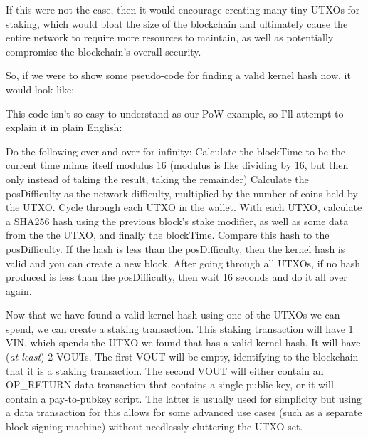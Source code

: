 If this were not the case, then it would encourage creating many tiny UTXOs 
for staking, which would bloat the size of the blockchain and ultimately 
cause the entire network to require more resources to maintain, as well as 
potentially compromise the blockchain's overall security.



So, if we were to show some pseudo-code for finding a valid kernel hash now, 
it would look like:



\vspace{5mm} %



\vspace{5mm} %



This code isn't so easy to understand as our PoW example, so I'll attempt to 
explain it in plain English:



Do the following over and over for infinity:
Calculate the blockTime to be the current time minus itself modulus 16
(modulus is like dividing by 16, but then only instead of taking the
result, taking the remainder)
Calculate the posDifficulty as the network difficulty, multiplied by the
number of coins held by the UTXO.
Cycle through each UTXO in the wallet. With each UTXO, calculate a SHA256
hash using the previous block's stake modifier, as well as some data from
the the UTXO, and finally the blockTime. Compare this hash to the
posDifficulty. If the hash is less than the posDifficulty, then the kernel
hash is valid and you can create a new block.
After going through all UTXOs, if no hash produced is less than the
posDifficulty, then wait 16 seconds and do it all over again.



Now that we have found a valid kernel hash using one of the UTXOs we can 
spend, we can create a staking transaction. This staking transaction will 
have 1 VIN, which spends the UTXO we found that has a valid kernel hash. 
It will have (\textit{at least}) 2 VOUTs. The first VOUT will be empty, 
identifying to the blockchain that it is a staking transaction. The second 
VOUT will either contain an OP\_RETURN data transaction that contains a single 
public key, or it will contain a pay-to-pubkey script. The latter is usually 
used for simplicity but using a data transaction for this allows for some 
advanced use cases (such as a separate block signing machine) without 
needlessly cluttering the UTXO set.



